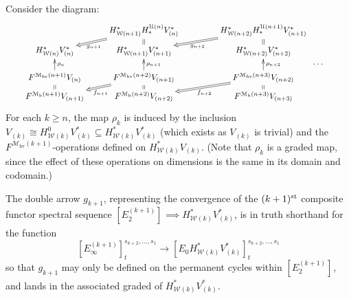 \documentclass[11pt]{amsart} \renewcommand{\baselinestretch}{1.2}
\theoremstyle{plain}
\theoremstyle{definition}
\renewcommand{\to}{\longrightarrow}
\newcommand{\calU}{\mathcal{U}}
\newcommand{\calw}{\mathcal{W}}
\newcommand{\calMh}{\mathcal{M}\dhor}
\newcommand{\calMhv}{\mathcal{M}_\mathrm{hv}}
\newcommand{\E}[5]{[E^{#1}_{#2}#3]^{#4}_{#5}}
\newcommand{\dhor}{_\mathrm{h}}
\begin{document}
\begin{Calculations of HWn}
Consider the diagram:
\[\qquad\xymatrix@R=1.5mm{
&
H^*_{\calw({n+1})}H_*^{\calU(n)}V^*_{(n)}\ar@{=>}[dl]^-{g_{n+1}}\ar@{=}[d]&
H^*_{\calw({n+2})}H_*^{\calU({n+1})}V^*_{({n+1})}\ar@{=>}[dl]^-{g_{n+2}}\ar@{=}[d]&
\\
 H^*_{\calw(n)}V^*_{(n)}
&H^*_{\calw({n+1})}V^*_{({n+1})}
&H^*_{\calw({n+2})}V^*_{({n+2})}
\\
&&\makebox[5cm][r]{\,$\smash{\cdots }$}
\\
 F^{\calMhv({n+1})}V_{(n)}\ar[uu]_-{\rho_n}\ar@{=}[d]
&F^{\calMhv({n+2})}V_{({n+1})}\ar[uu]_-{\rho_{n+1}}\ar@{=}[d]\ar@{=>}[ld]^-{f_{n+1}}
&F^{\calMhv({n+3})}V_{({n+2})}\ar[uu]_-{\rho_{n+2}}\ar@{=}[d]\ar@{=>}[ld]^-{f_{n+2}}
\\
 F^{\calMh({n+1})}V_{({n+1})}
&F^{\calMh({n+2})}V_{({n+2})}
&F^{\calMh({n+3})}V_{({n+3})}
}\]
For each $k\geq n$, the map $\rho_k$ is induced by the inclusion $V_{(k)}\cong H^{0}_{\calw(k)}V^*_{(k)}\subseteq H^*_{\calw(k)}V^*_{(k)}$ (which exists as $V_{(k)}$ is trivial) and the $F^{\calMhv(k+1)}$-operations defined on $H^*_{\calw(k)}V_{(k)}$. (Note that $\rho_{k}$ is a graded map, since the effect of these operations on dimensions is the same in its domain and codomain.)

The double arrow $g_{k+1}$, representing the convergence of the $(k+1)^{\textup{st}}$ composite functor spectral sequence $\E{(k+1)}{2}{}{}{}\implies H^*_{\calw(k)}V^*_{(k)}$, is in truth shorthand for the function
\[\E{(k+1)}{\infty}{}{s_{k+2},\ldots,s_1}{t}\to \E{}{0}{H^*_{\calw(k)}V^*_{(k)}}{s_{k+2},\ldots,s_1}{t} \]
so that $g_{k+1}$ may only be defined on the permanent cycles within $\E{(k+1)}{2}{}{}{}$, %
 and lands in the associated graded of $H^*_{\calw(k)}V^*_{(k)}$.


\end{Calculations of HWn}
\end{document}
